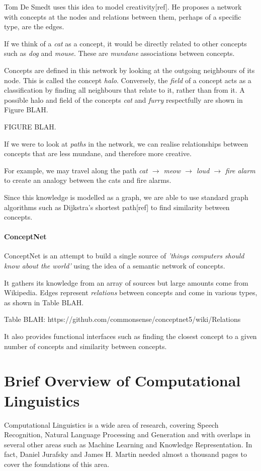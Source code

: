Tom De Smedt uses this idea to model creativity[ref]. He proposes a network with concepts at the nodes and relations between them, perhaps of a specific type, are the edges.

If we think of a \textit{cat} as a concept, it would be directly related to other concepts such as \textit{dog} and \textit{mouse}. These are \textit{mundane} associations between concepts.

Concepts are defined in this network by looking at the outgoing neighbours of its node. This is called the concept \textit{halo}. Conversely, the \textit{field} of a concept acts as a classification by finding all neighbours that relate to it, rather than from it. A possible halo and field of the concepts \textit{cat} and \textit{furry} respectfully are shown in Figure BLAH.

FIGURE BLAH. 

If we were to look at \textit{paths} in the network, we can realise relationships between concepts that are less mundane, and therefore more creative.

For example, we may travel along the path \textit{cat $\rightarrow$ meow $\rightarrow$ loud $\rightarrow$ fire alarm} to create an analogy between the cats and fire alarms.

Since this knowledge is modelled as a graph, we are able to use standard graph algorithms such as Dijkstra's shortest path[ref] to find similarity between concepts.

\paragraph{ConceptNet}
\label{sec:conceptnet}
ConceptNet\cite{liu2004conceptnet} is an attempt to build a single source of \textit{'things computers should know about the world'} using the idea of a semantic network of concepts.

It gathers its knowledge from an array of sources but large amounts come from Wikipedia. Edges represent \textit{relations} between concepts and come in various types, as shown in Table BLAH.

Table BLAH: https://github.com/commonsense/conceptnet5/wiki/Relations

It also provides functional interfaces such as finding the closest concept to a given number of concepts and similarity between concepts.

\section{Brief Overview of Computational Linguistics}
Computational Linguistics is a wide area of research, covering Speech Recognition, Natural Language Processing and Generation and with overlaps in several other areas such as Machine Learning and Knowledge Representation. In fact, Daniel Jurafsky and James H. Martin needed almost a thousand pages to cover the foundations of this area\cite{jurafsky2000speech}.

